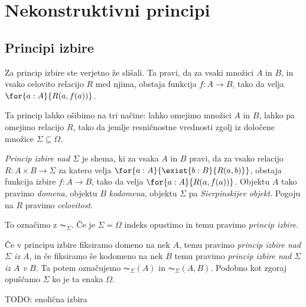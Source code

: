 \section{Nekonstruktivni principi}

\subsection{Principi izbire}

Za princip izbire ste verjetno že slišali. Ta pravi, da za vsaki množici \(A\)
in \(B\), in vsako celovito relacijo \(R\) med njima, obstaja funkcija
\(f : A → B\), tako da velja \(\for{a : A}{R(a, f(a))}\).

Ta princip lahko ošibimo na tri načine: lahko omejimo množici \(A\) in \(B\),
lahko pa omejimo relacijo \(R\), tako da jemlje resničnostne vrednosti zgolj iz
določene množice \(Σ ⊆ Ω\).

\begin{definicija}
  \emph{Princip izbire nad \(Σ\)} je shema, ki za vsaka \(A\) in \(B\) pravi,
  da za vsako relacijo \(R : A×B → Σ\) za katero velja
  \(\for{a:A}{\exist{b:B}{R(a,b)}}\), obstaja funkcija izbire \(f : A → B\),
  tako da velja \(\for{a:A}{R(a,f(a))}\). Objektu \(A\) tako pravimo
  \emph{domena}, objektu \(B\) \emph{kodomena}, objektu \(Σ\) pa
  \emph{Sierpinskijev objekt}.
  Pogoju na \(R\) pravimo \emph{celovitost}.

  To označimo z \(\AC_Σ\). Če je \(Σ = Ω\) indeks opustimo in temu pravimo
  \emph{princip izbire}.
\end{definicija}
\begin{definicija}
  Če v principu izbire fiksiramo domeno na nek \(A\), temu pravimo
  \emph{princip izbire nad \(Σ\) iz \(A\)}, in če fiksiramo še kodomeno na nek
  \(B\) temu pravimo \emph{princip izbire nad \(Σ\) iz \(A\) v \(B\)}. Ta potem
  označujemo \(\AC_Σ(A)\) in \(\AC_Σ(A, B)\). Podobno kot zgoraj opuščamo \(Σ\)
  ko je ta enaka \(Ω\).
\end{definicija}

TODO: enolična izbira

